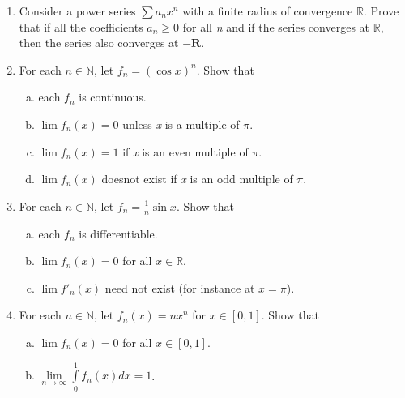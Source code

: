 \documentclass[journal,12pt,twocolumn]{IEEEtran}
\begin{document}
\begin{enumerate}
\begin{enumerate}[(a)]
\begin{enumerate}[(i)]
\end{enumerate}

\end{enumerate}

\item Consider a power series $\sum\nolimits a_{n}x^n$ with a finite radius of convergence $\mathbb{R}$. Prove that if all the coefficients $a_{n}\geqslant0$ for all \textit{n} and if the series converges at $\mathbb{R}$, then the series also converges at $\mathbf{-R}$.

\item For each $\textit{n}\in\mathbb{N}$, let $f_{n} = (\cos x)^n$. Show that

\begin{enumerate}[(a)]

\item each $f_{n}$ is continuous.
\item $\lim f_{n}(x) = 0$ unless \textit{x} is a multiple of $\pi$.
\item $\lim f_{n}(x) = 1$ if \textit{x} is an even multiple of $\pi$.
\item $\lim f_{n}(x)$ doesnot exist if \textit{x} is an odd multiple of $\pi$.

\end{enumerate}

\item For each $\textit{n}\in\mathbb{N}$, let $f_{n} = \frac{1}{n}\sin x$. Show that

\begin{enumerate}[(a)]

\item each $f_n$ is differentiable.
\item $\lim f_n(x) = 0$ for all $\textit{x} \in \mathbb{R}$.
\item $\lim f'_{n}(x)$ need not exist (for instance at $x = \pi$).

\end{enumerate}

\item For each $\textit{n} \in \mathbb{N}$, let $f_n(x) = nx^n$ for $\textit{x} \in [0,1]$. Show that

\begin{enumerate}[(a)]

\item $\lim f_n(x) = 0$ for all $\textit{x} \in [0,1]$.
\item $\lim\limits_{n\to\infty}\int\limits_{0}^{1} f_n(x)dx = 1$.

\end{enumerate}


\end{enumerate}
\end{document}
